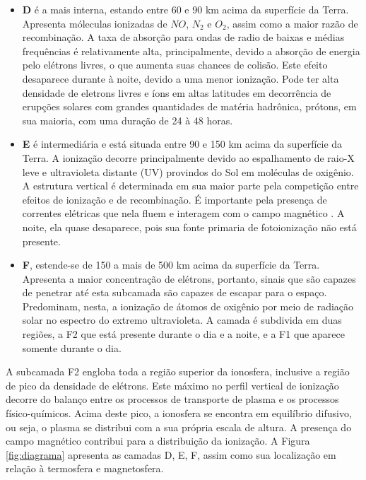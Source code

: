 \begin{itemize}
\item {\bf D} é a mais interna, estando entre 60 e 90 km acima da superfície da Terra. Apresenta móleculas ionizadas de $NO$, $N_2$ e $O_2$, assim como a maior razão de recombinação. A taxa de absorção para ondas de radio de baixas e médias frequências é relativamente alta, principalmente, devido a absorção de energia pelo elétrons livres, o que aumenta suas chances de colisão. Este efeito desaparece durante à noite, devido a uma menor ionização. Pode ter alta densidade de eletrons livres e íons em altas latitudes em decorrência de erupções solares com grandes quantidades de matéria hadrônica, prótons, em sua maioria, com uma duração de 24 à 48 horas.

\item {\bf E} é intermediária e está situada entre 90 e 150 km acima da superfície da Terra. A ionização decorre principalmente devido ao espalhamento de raio-X leve e ultravioleta distante (UV) provindos do Sol em moléculas de oxigênio. A estrutura vertical é determinada em sua maior parte pela competição entre efeitos de ionização e de recombinação. É importante pela presença de correntes elétricas que nela fluem e interagem com o campo magnético \cite{KIRCHHOFF:1991}. A noite, ela quase desaparece, pois sua fonte primaria de fotoionização não está presente.

\item {\bf F}, estende-se de 150 a mais de 500 km acima da superfície da Terra. Apresenta a maior concentração de elétrons, portanto, sinais que são capazes de penetrar até esta subcamada são capazes de escapar para o espaço. Predominam, nesta, a ionização de átomos de oxigênio por meio de radiação solar no espectro do extremo ultravioleta. A camada é subdivida em duas regiões, a F2 que está presente durante o dia e a noite, e a F1 que aparece somente durante o dia. 
\end{itemize}

A subcamada F2 engloba toda a região superior da ionosfera, inclusive a região de pico da densidade de elétrons. Este máximo no perfil vertical de ionização decorre do balanço entre os processos de transporte de plasma e os processos físico-químicos. Acima deste pico, a ionosfera se encontra em equilíbrio difusivo, ou seja, o plasma se distribui com a sua própria escala de altura. A presença do campo magnético contribui para a distribuição da ionização. A Figura \ref{fig:diagrama} apresenta as camadas D, E, F, assim como sua localização em relação à termosfera e magnetosfera.


